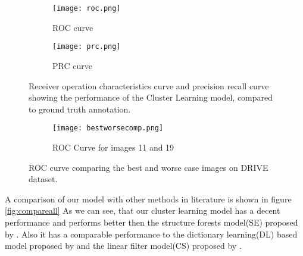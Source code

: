 \begin{figure}
	\centering
	\begin{subfigure}[b]{0.45\textwidth}
		\texttt{[image: roc.png]}
		\caption{ROC curve}
		\label{fig:roc}
	\end{subfigure}
	\begin{subfigure}[b]{0.45\textwidth}
		\texttt{[image: prc.png]}
		\caption{PRC curve}
		\label{fig:prc}
	\end{subfigure}
	\caption[ROC and PRC curve for Cluster Learning based model]{Receiver operation characteristics curve and precision recall curve showing the performance of the Cluster Learning model, compared to ground truth annotation.}
	\label{fig:rocprc}
\end{figure}
\begin{figure}
	\centering
	
	\begin{subfigure}[b]{0.75\textwidth}
		\texttt{[image: bestworsecomp.png]}
		\caption{ROC Curve for images 11 and 19}
		\label{fig:bestworse}
	\end{subfigure}
	\caption[ROC curve comparing the best and worse case on DRIVE set]{ROC curve comparing the best and worse case images on DRIVE dataset.}
	\label{fig:bestroc}
\end{figure}
\clearpage
A comparison of our model with other methods in literature is shown in figure \ref{fig:compareall}
As we can see, that our cluster learning model has a decent performance and performs better then the structure forests model(SE) proposed by \citep{dollar2013structured}. Also it has a comparable performance to the dictionary learning(DL) based model proposed by \citep{rigamonti2013learning}  and the linear filter model(CS) proposed by \cite{rigamonti2012accurate}.\\

